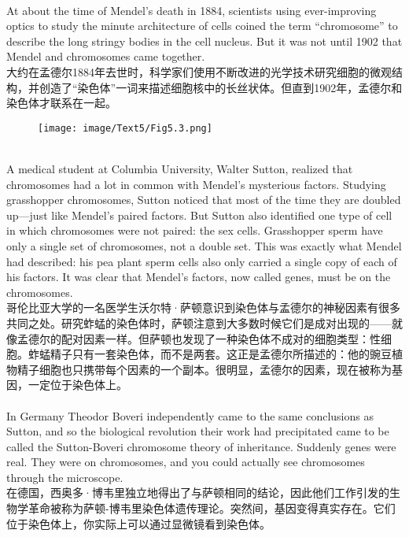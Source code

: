 \documentclass{article}
\begin{document}
\\
At about the time of Mendel’s death in 1884, scientists using ever-improving optics to study the minute architecture of cells coined the term “chromosome” to describe the long stringy bodies in the cell nucleus. But it was not until 1902 that Mendel and chromosomes came together.\\
大约在孟德尔1884年去世时，科学家们使用不断改进的光学技术研究细胞的微观结构，并创造了“染色体”一词来描述细胞核中的长丝状体。但直到1902年，孟德尔和染色体才联系在一起。\\

\begin{figure}
    \centering
    \texttt{[image: image/Text5/Fig5.3.png]}
\end{figure}

\\
A medical student at Columbia University, Walter Sutton, realized that chromosomes had a lot in common with Mendel’s mysterious factors. Studying grasshopper chromosomes, Sutton noticed that most of the time they are doubled up—just like Mendel’s paired factors. But Sutton also identified one type of cell in which chromosomes were not paired: the sex cells. Grasshopper sperm have only a single set of chromosomes, not a double set. This was exactly what Mendel had described: his pea plant sperm cells also only carried a single copy of each of his factors. It was clear that Mendel’s factors, now called genes, must be on the chromosomes.\\
哥伦比亚大学的一名医学生沃尔特·萨顿意识到染色体与孟德尔的神秘因素有很多共同之处。研究蚱蜢的染色体时，萨顿注意到大多数时候它们是成对出现的——就像孟德尔的配对因素一样。但萨顿也发现了一种染色体不成对的细胞类型：性细胞。蚱蜢精子只有一套染色体，而不是两套。这正是孟德尔所描述的：他的豌豆植物精子细胞也只携带每个因素的一个副本。很明显，孟德尔的因素，现在被称为基因，一定位于染色体上。\\

\\
In Germany Theodor Boveri independently came to the same conclusions as Sutton, and so the biological revolution their work had precipitated came to be called the Sutton-Boveri chromosome theory of inheritance. Suddenly genes were real. They were on chromosomes, and you could actually see chromosomes through the microscope.\\
在德国，西奥多·博韦里独立地得出了与萨顿相同的结论，因此他们工作引发的生物学革命被称为萨顿-博韦里染色体遗传理论。突然间，基因变得真实存在。它们位于染色体上，你实际上可以通过显微镜看到染色体。\\
\end{document}

